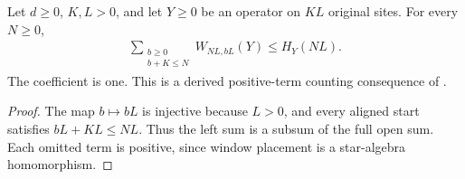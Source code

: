 \begin{lemma}
    \label{thm:aligned_positive_window_sum}
    \leanok
    Let $d\geq0$, $K,L>0$, and let $Y\geq0$ be an operator on $KL$
    original sites. For every $N\geq0$,
    \begin{align}
        \sum_{\substack{b\geq0 \\b+K\leq N}}W_{NL,bL}(Y)
        \leq H_Y(NL).
    \end{align}
    The coefficient is one. This is a derived positive-term counting
    consequence of \cite[equation~(3.12)]{Nachtergaele1996Spectral}.
\end{lemma}
\begin{proof}\leanok
    The map $b\mapsto bL$ is injective because $L>0$, and every aligned
    start satisfies $bL+KL\leq NL$. Thus the left sum is a subsum of the
    full open sum. Each omitted term is positive, since window placement is
    a star-algebra homomorphism.
\end{proof}

